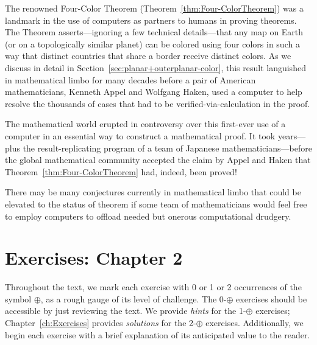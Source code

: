 \smallskip

  
The renowned Four-Color Theorem (Theorem~\ref{thm:Four-ColorTheorem}) was a landmark in the use of computers as partners to humans in proving theorems.  The Theorem asserts---ignoring a few technical details---that any map on Earth (or on a topologically similar planet) can be colored using four colors in such a way that distinct countries that share a border receive distinct colors.  As we discuss in detail in Section~\ref{sec:planar+outerplanar-color}, this result languished in mathematical limbo for many decades before a pair of American mathematicians, Kenneth Appel and Wolfgang Haken, used a computer to help resolve the thousands of cases that had to be verified-via-calculation in the proof.

The mathematical world erupted in controversy over this first-ever use of a computer in an essential way to construct a mathematical proof.  It took years---plus the result-replicating program of a team of Japanese mathematicians---before the global mathematical community accepted the claim by Appel and Haken that Theorem~\ref{thm:Four-ColorTheorem} had, indeed, been proved!

\medskip

There may be many conjectures currently in mathematical limbo that could be elevated to the status of theorem if some team of mathematicians would feel free to employ computers to offload needed but onerous computational drudgery.



\section{Exercises: Chapter 2}

Throughout the text, we mark each exercise with 0 or 1 or 2 occurrences of the symbol $\oplus$, as a rough gauge of its level of challenge.  The 0-$\oplus$ exercises should be accessible by just reviewing the text.  We provide {\em hints} for the 1-$\oplus$ exercises; Chapter~\ref{ch:Exercises} provides {\em solutions} for the 2-$\oplus$ exercises.  Additionally, we begin each exercise with a brief explanation of its anticipated value to the reader.

